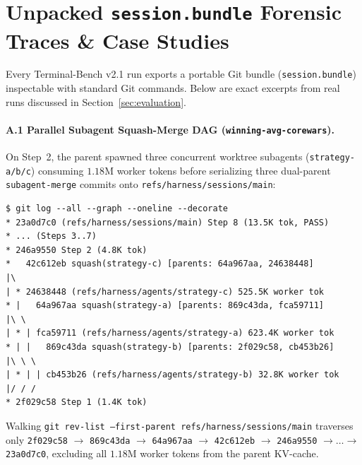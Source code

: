 \documentclass[11pt]{article}
\newcommand{\code}[1]{\nolinkurl{#1}}
\begin{document}



\appendix
\section{Unpacked \texttt{session.bundle} Forensic Traces \& Case Studies}
\label{app:traces}

Every Terminal-Bench v2.1 run exports a portable Git bundle (\texttt{session.bundle}) inspectable with standard Git commands. Below are exact excerpts from real runs discussed in Section~\ref{sec:evaluation}.

\paragraph{A.1 Parallel Subagent Squash-Merge DAG (\code{winning-avg-corewars}).}
On Step~2, the parent spawned three concurrent worktree subagents (\texttt{strategy-a/b/c}) consuming $1.18\mathrm{M}$ worker tokens before serializing three dual-parent \texttt{subagent-merge} commits onto \code{refs/harness/sessions/main}:
\begin{lstlisting}
$ git log --all --graph --oneline --decorate
* 23a0d7c0 (refs/harness/sessions/main) Step 8 (13.5K tok, PASS)
* ... (Steps 3..7)
* 246a9550 Step 2 (4.8K tok)
*   42c612eb squash(strategy-c) [parents: 64a967aa, 24638448]
|\
| * 24638448 (refs/harness/agents/strategy-c) 525.5K worker tok
* |   64a967aa squash(strategy-a) [parents: 869c43da, fca59711]
|\ \
| * | fca59711 (refs/harness/agents/strategy-a) 623.4K worker tok
* | |   869c43da squash(strategy-b) [parents: 2f029c58, cb453b26]
|\ \ \
| * | | cb453b26 (refs/harness/agents/strategy-b) 32.8K worker tok
|/ / /
* 2f029c58 Step 1 (1.4K tok)
\end{lstlisting}
Walking \texttt{git rev-list --first-parent refs/harness/sessions/main} traverses only \texttt{2f029c58} $\to$ \texttt{869c43da} $\to$ \texttt{64a967aa} $\to$ \texttt{42c612eb} $\to$ \texttt{246a9550} $\to \dots \to$ \texttt{23a0d7c0}, excluding all $1.18\mathrm{M}$ worker tokens from the parent KV-cache.
\end{document}
